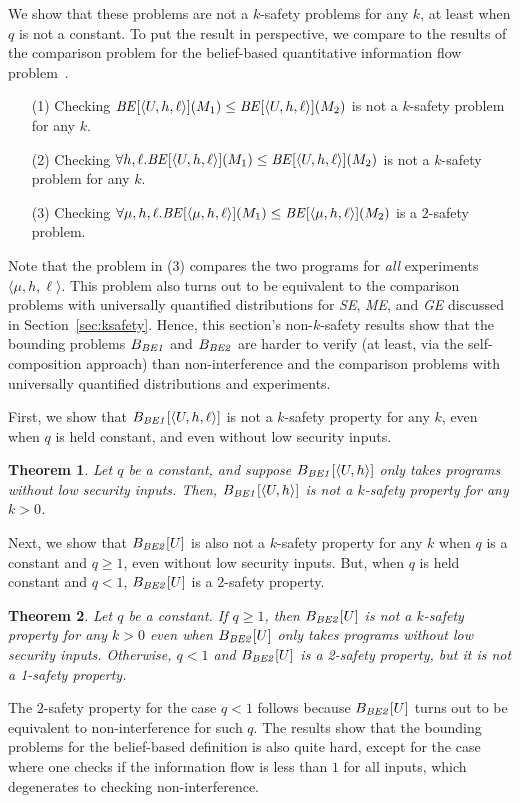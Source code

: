 \documentclass{llncs}
\newtheorem{theorem}{Theorem}[section]
\newcommand{\aseq}[1]{\langle#1\rangle}
\begin{document}
We show that these problems are not a $k$-safety problems for any $k$,
at least when $q$ is not a constant.  To put the result in
perspective, we compare to the results of the comparison problem for
the belief-based quantitative information flow
problem~\cite{yasuoka:toplas2010submit}.
\begin{itemize}
\item[(1)] Checking ${\it BE}[\aseq{U,h,\ell}](M_1) \leq{\it BE}[\aseq{U,h,\ell}](M_2)$ is not a $k$-safety problem for any $k$.
\item[(2)] Checking $\forall h,\ell.{\it BE}[\aseq{U,h,\ell}](M_1) \leq{\it BE}[\aseq{U,h,\ell}](M_2)$ is not a $k$-safety problem for any $k$.
\item[(3)] Checking $\forall \mu,h,\ell.{\it BE}[\aseq{\mu,h,\ell}](M_1) \leq{\it BE}[\aseq{\mu,h,\ell}](M_2)$ is a $2$-safety problem.
\end{itemize}
Note that the problem in (3) compares the two programs for {\em all}
experiments $\aseq{\mu,h,\ell}$.  This problem also turns out to
be equivalent to the comparison problems with universally quantified
distributions for {\it SE}, {\it ME}, and {\it GE} discussed in
Section~\ref{sec:ksafety}.  Hence, this section's non-$k$-safety
results show that the bounding problems $B_{\it BE1}$ and $B_{\it
  BE2}$ are harder to verify (at least, via the self-composition
approach) than non-interference and the comparison problems with
universally quantified distributions and experiments.


First, we show that $B_{\it BE1}[\aseq{U,h,\ell}]$ is not a $k$-safety
property for any $k$, even when $q$ is held constant, and even without
low security inputs.
\begin{theorem}
\label{thm:be1nk}
Let $q$ be a constant, and suppose $B_{\it BE1}[\aseq{U,h}]$ only
takes programs without low security inputs.  Then, $B_{\it
  BE1}[\aseq{U,h}]$ is not a $k$-safety property for any $k > 0$.
\end{theorem}
Next, we show that $B_{\it BE2}[U]$ is also not a $k$-safety property
for any $k$ when $q$ is a constant and $q \geq 1$, even without low
security inputs.  But, when $q$ is held constant and $q < 1$, $B_{\it
  BE2}[U]$ is a $2$-safety property.
\begin{theorem}
\label{thm:be2nk1}
  Let $q$ be a constant.  If $q\ge 1$, then $B_{\it BE2}[U]$ is not a
  $k$-safety property for any $k > 0$ even when $B_{\it BE2}[U]$ only
  takes programs without low security inputs.  Otherwise, $q<1$ and
  $B_{\it BE2}[U]$ is a 2-safety property, but it is not a 1-safety
  property.
\end{theorem}
The $2$-safety property for the case $q < 1$ follows because $B_{\it
  BE2}[U]$ turns out to be equivalent to non-interference for such
$q$.  The results show that the bounding problems for the belief-based
definition is also quite hard, except for the case where one checks if
the information flow is less than $1$ for all inputs, which degenerates
to checking non-interference.
\end{document}
